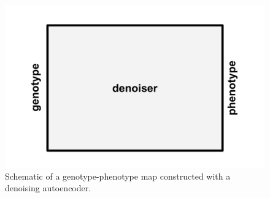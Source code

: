 \begin{figure}
  \includegraphics[width=\linewidth]{img/denoiser_map}
  \caption{Schematic of a genotype-phenotype map constructed with a denoising autoencoder.}
  \label{fig:denoiser_map}
\end{figure}
